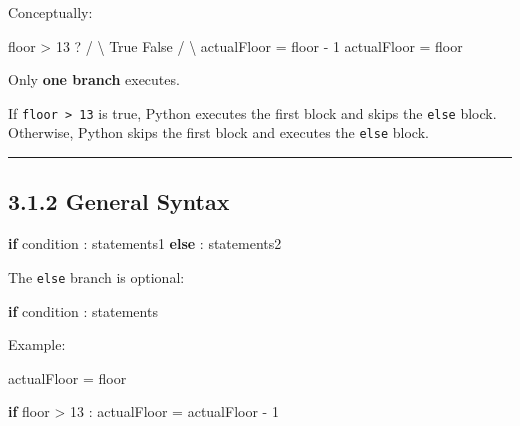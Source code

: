 \documentclass[
  11pt,
  a4paper,
]{article}
\newenvironment{Shaded}{}{}
\newcommand{\ControlFlowTok}[1]{\textcolor[rgb]{0.00,0.44,0.13}{\textbf{#1}}}
\newcommand{\DecValTok}[1]{\textcolor[rgb]{0.25,0.63,0.44}{#1}}
\newcommand{\NormalTok}[1]{#1}
\newcommand{\OperatorTok}[1]{\textcolor[rgb]{0.40,0.40,0.40}{#1}}
\begin{document}
Conceptually:

\begin{Shaded}
\begin{Highlighting}[]
\NormalTok{                 floor \textgreater{} 13 ?}
\NormalTok{                  /       \textbackslash{}}
\NormalTok{              True       False}
\NormalTok{               /            \textbackslash{}}
\NormalTok{ actualFloor = floor {-} 1   actualFloor = floor}
\end{Highlighting}
\end{Shaded}

Only \textbf{one branch} executes.

If \texttt{floor\ \textgreater{}\ 13} is true, Python executes the first
block and skips the \texttt{else} block. Otherwise, Python skips the
first block and executes the \texttt{else} block.

\begin{center}\rule{0.5\linewidth}{0.5pt}\end{center}

\subsection{3.1.2 General Syntax}\label{general-syntax}

\begin{Shaded}
\begin{Highlighting}[]
\ControlFlowTok{if}\NormalTok{ condition :}
\NormalTok{    statements1}
\ControlFlowTok{else}\NormalTok{ :}
\NormalTok{    statements2}
\end{Highlighting}
\end{Shaded}

The \texttt{else} branch is optional:

\begin{Shaded}
\begin{Highlighting}[]
\ControlFlowTok{if}\NormalTok{ condition :}
\NormalTok{    statements}
\end{Highlighting}
\end{Shaded}

Example:

\begin{Shaded}
\begin{Highlighting}[]
\NormalTok{actualFloor }\OperatorTok{=}\NormalTok{ floor}

\ControlFlowTok{if}\NormalTok{ floor }\OperatorTok{\textgreater{}} \DecValTok{13}\NormalTok{ :}
\NormalTok{    actualFloor }\OperatorTok{=}\NormalTok{ actualFloor }\OperatorTok{{-}} \DecValTok{1}
\end{Highlighting}
\end{Shaded}
\end{document}
